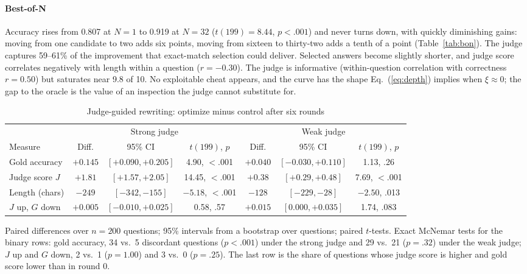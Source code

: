 \documentclass[acmsmall,screen,review,anonymous]{acmart}
\theoremstyle{acmdefinition}
\begin{document}
\paragraph{Best-of-N} Accuracy rises from 0.807 at $N = 1$ to 0.919 at $N = 32$ ($t(199) = 8.44$, $p < .001$) and never turns down, with quickly diminishing gains: moving from one candidate to two adds six points, moving from sixteen to thirty-two adds a tenth of a point (Table~\ref{tab:bon}). The judge captures 59--61\% of the improvement that exact-match selection could deliver. Selected answers become slightly shorter, and judge score correlates negatively with length within a question ($r = -0.30$). The judge is informative (within-question correlation with correctness $r = 0.50$) but saturates near 9.8 of 10. No exploitable cheat appears, and the curve has the shape Eq.~(\ref{eq:depth}) implies when $\xi \approx 0$; the gap to the oracle is the value of an inspection the judge cannot substitute for.

\begin{table}[t]
\caption{Judge-guided rewriting: optimize minus control after six rounds}\label{tab:rewrite}
\small
\begin{tabular}{@{}lcccccc@{}}
\toprule
 & \multicolumn{3}{c}{Strong judge} & \multicolumn{3}{c}{Weak judge} \\
\cmidrule(lr){2-4}\cmidrule(l){5-7}
Measure & Diff. & 95\% CI & $t(199)$, $p$ & Diff. & 95\% CI & $t(199)$, $p$ \\
\midrule
Gold accuracy & $+0.145$ & $[+0.090, +0.205]$ & 4.90, $<$.001 & $+0.040$ & $[-0.030, +0.110]$ & 1.13, .26 \\
Judge score $J$ & $+1.81$ & $[+1.57, +2.05]$ & 14.45, $<$.001 & $+0.38$ & $[+0.29, +0.48]$ & 7.69, $<$.001 \\
Length (chars) & $-249$ & $[-342, -155]$ & $-5.18$, $<$.001 & $-128$ & $[-229, -28]$ & $-2.50$, .013 \\
$J$ up, $G$ down & $+0.005$ & $[-0.010, +0.025]$ & 0.58, .57 & $+0.015$ & $[0.000, +0.035]$ & 1.74, .083 \\
\bottomrule
\end{tabular}
\par\smallskip\footnotesize Paired differences over $n = 200$ questions; 95\% intervals from a bootstrap over questions; paired $t$-tests. Exact McNemar tests for the binary rows: gold accuracy, 34 vs.\ 5 discordant questions ($p < .001$) under the strong judge and 29 vs.\ 21 ($p = .32$) under the weak judge; $J$ up and $G$ down, 2 vs.\ 1 ($p = 1.00$) and 3 vs.\ 0 ($p = .25$). The last row is the share of questions whose judge score is higher and gold score lower than in round 0.
\end{table}
\end{document}
